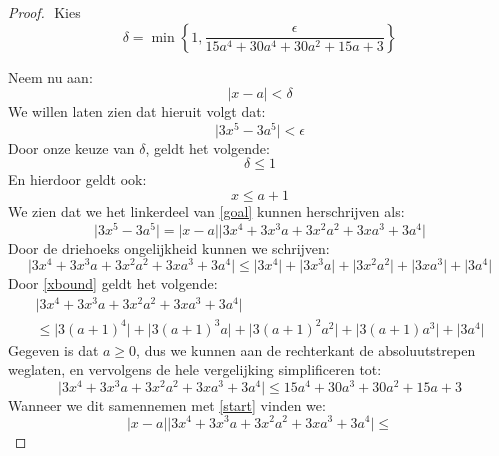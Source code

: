 \documentclass[12pt, dutch, a4paper]{article}
\theoremstyle{definition}
\begin{document}
\begin{proof} $ $ \newline
  Kies \[\delta = 
  \min{\left\{1,\frac{\epsilon}{15a^4 + 30a^4 + 30a^2 + 15a + 3}\right\}}\]

  Neem nu aan:
  \begin{equation} \label{start}
    \lvert x - a \rvert < \delta 
  \end{equation}
  We willen laten zien dat hieruit volgt dat:
  \begin{equation} \label{goal}
    \lvert 3x^5 - 3a^5 \rvert < \epsilon
  \end{equation}
  Door onze keuze van $\delta$, geldt het volgende:
  \begin{equation}
    \delta \leq 1 
  \end{equation}
  En hierdoor geldt ook:
  \begin{equation} \label{xbound}
    x \leq a + 1
  \end{equation}
  We zien dat we het linkerdeel van \cref{goal} kunnen herschrijven als:
  \begin{equation} \label{buitenhaken}
    \lvert 3x^5 - 3a^5 \rvert = 
    \lvert x - a \rvert \lvert 3x^4 + 3x^3a + 3x^2a^2 + 3xa^3 + 3a^4 \rvert 
  \end{equation}
  Door de driehoeks ongelijkheid kunnen we schrijven:
  \begin{equation}
    \lvert 3x^4 + 3x^3a + 3x^2a^2 + 3xa^3 + 3a^4 \rvert \leq
    \lvert 3x^4\rvert + \lvert3x^3a\rvert + \lvert3x^2a^2\rvert + 
    \lvert3xa^3\rvert + \lvert3a^4 \rvert
  \end{equation}
  Door \cref{xbound} geldt het volgende:
  \begin{multline}
    \lvert 3x^4 + 3x^3a + 3x^2a^2 + 3xa^3 + 3a^4 \rvert \\ \leq 
    \lvert 3(a + 1)^4\rvert + \lvert3(a + 1)^3a\rvert + \lvert3(a + 1)^2a^2\rvert + 
    \lvert3(a + 1)a^3\rvert + \lvert3a^4 \rvert
  \end{multline}
  Gegeven is dat $a \geq 0$, 
  dus we kunnen aan de rechterkant de absoluutstrepen weglaten, 
  en vervolgens de hele vergelijking simplificeren tot:
  \begin{equation}
    \lvert 3x^4 + 3x^3a + 3x^2a^2 + 3xa^3 + 3a^4 \rvert \leq
    15a^4 + 30a^3 + 30a^2 + 15a + 3
  \end{equation}
  Wanneer we dit samennemen met \cref{start} vinden we:
  \begin{equation}
    \lvert x - a \rvert 
    \lvert 3x^4 + 3x^3a + 3x^2a^2 + 3xa^3 + 3a^4 \rvert \leq

\end{equation}
\end{proof}
\end{document}

